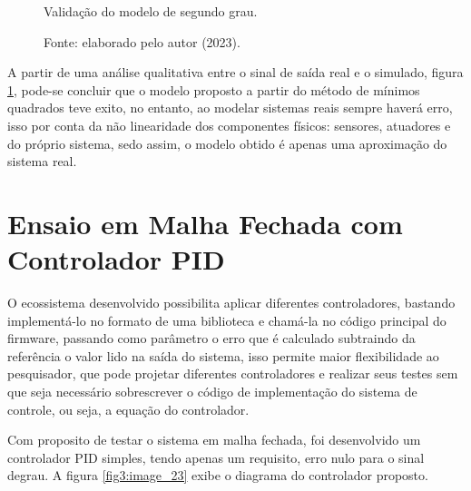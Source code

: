 \begin{figure}[!h]
	\centering
	\caption{Validação do modelo de segundo grau.}
	\caption*{Fonte: elaborado pelo autor (2023).}
	\label{fig3:image_22}
\end{figure}


A partir de uma análise qualitativa entre o sinal de saída real e o simulado, figura \ref{fig3:image_22}, pode-se concluir que o modelo proposto a partir do método de mínimos quadrados teve exito, no entanto, ao modelar sistemas reais sempre haverá erro, isso por conta da não linearidade dos componentes físicos: sensores, atuadores e do próprio sistema, sedo assim, o modelo obtido é apenas uma aproximação do sistema real. %


\section{Ensaio em Malha Fechada com Controlador PID}
\label{malha_fechada}

O ecossistema desenvolvido possibilita aplicar diferentes controladores, bastando implementá-lo no formato de uma biblioteca e chamá-la no código principal do firmware, passando como parâmetro o erro que é calculado subtraindo da referência o valor lido na saída do sistema, isso permite maior flexibilidade ao pesquisador, que pode projetar diferentes controladores e realizar seus testes sem que seja necessário sobrescrever o código de implementação do sistema de controle, ou seja, a equação do controlador.

Com  proposito de testar o sistema em malha fechada, foi desenvolvido um controlador PID simples, tendo apenas um requisito, erro nulo para o sinal degrau. A figura \ref{fig3:image_23} exibe o diagrama do controlador proposto.%


